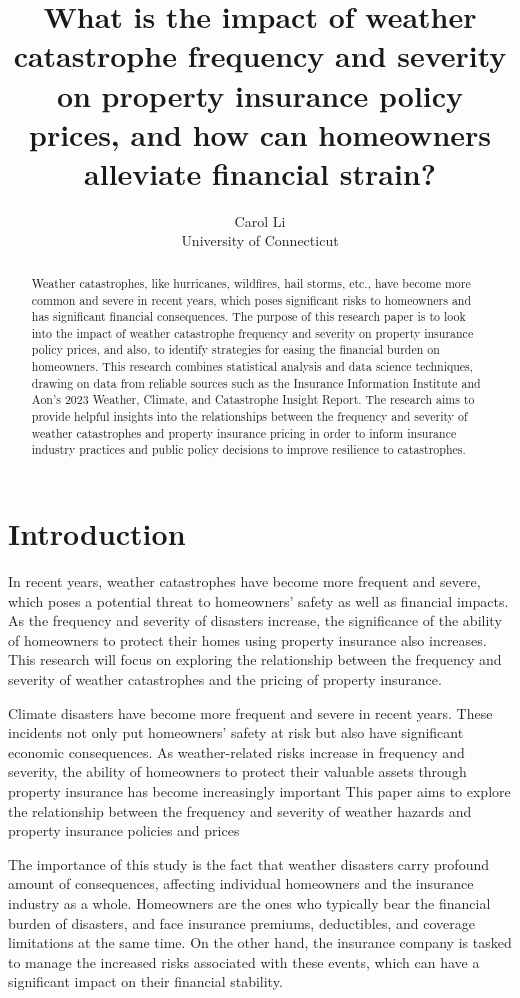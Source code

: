 \documentclass[12pt]{article}
\title{What is the impact of weather catastrophe frequency and severity on property insurance policy 
prices, and how can homeowners alleviate financial strain?}
\author{Carol Li\\
    University of Connecticut
}
\begin{document}
\maketitle

\begin{abstract}
Weather catastrophes, like hurricanes, wildfires, hail storms, etc., have become more common and severe in recent years, which poses 
significant risks to homeowners and has significant financial consequences. The purpose of this research paper is to look into the 
impact of weather catastrophe frequency and severity on property insurance policy prices, and also, to identify strategies for easing 
the financial burden on homeowners. This research combines statistical analysis and data science techniques, drawing on data from 
reliable sources such as the Insurance Information Institute and Aon's 2023 Weather, Climate, and Catastrophe Insight Report. The 
research aims to provide helpful insights into the relationships between the frequency and severity of weather catastrophes and 
property insurance pricing in order to inform insurance industry practices and public policy decisions to improve resilience to 
catastrophes.
\end{abstract}


\section{Introduction}
\label{sec:intro}
In recent years, weather catastrophes have become more frequent and severe, which poses a potential threat to homeowners' safety as 
well as financial impacts. As the frequency and severity of disasters increase, the significance of the ability of homeowners to 
protect their homes using property insurance also increases. This research will focus on exploring the relationship between the 
frequency and severity of weather catastrophes and the pricing of property insurance.

Climate disasters have become more frequent and severe in recent years. These incidents not only put homeowners' safety at risk but 
also have significant economic consequences. As weather-related risks increase in frequency and severity, the ability of homeowners to 
protect their valuable assets through property insurance has become increasingly important This paper aims to explore the relationship 
between the frequency and severity of weather hazards and property insurance policies and prices

The importance of this study is the fact that weather disasters carry profound amount of consequences, affecting individual homeowners 
and the insurance industry as a whole. Homeowners are the ones who typically bear the financial burden of disasters, and face 
insurance premiums, deductibles, and coverage limitations at the same time. On the other hand, the insurance company is tasked to 
manage the increased risks associated with these events, which can have a significant impact on their financial stability.
\end{document}
